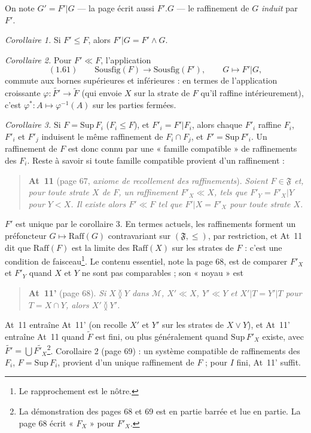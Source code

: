 \documentclass[11pt,a4paper]{article}
\begin{document}
On note $G' = F'|G$ --- la page écrit aussi $F'.G$ --- le raffinement de $G$
\emph{induit} par $F'$.

\emph{Corollaire 1.} Si $F' \leq F$, alors $F'|G = F' \wedge G$.

\emph{Corollaire 2.} Pour $F' \ll F$, l'application
\[
(1.61) \qquad \mathrm{Sousfig}(F) \longrightarrow \mathrm{Sousfig}(F'), \qquad G
\longmapsto F'|G ,
\]
commute aux bornes supérieures et inférieures : en termes de l'application
croissante $\varphi : \widetilde{F'} \to \widetilde{F}$ (qui envoie $X$ sur la
strate de $F$ qu'il raffine intérieurement), c'est $\varphi^{*} : A \mapsto
\varphi^{-1}(A)$ sur les parties fermées.

\emph{Corollaire 3.} Si $F = \mathrm{Sup}\,F_{i}$ ($F_{i} \leq F$), et $F'_{i} =
F'|F_{i}$, alors chaque $F'_{i}$ raffine $F_{i}$, $F'_{i}$ et $F'_{j}$ induisent
le même raffinement de $F_{i} \cap F_{j}$, et $F' = \mathrm{Sup}\,F'_{i}$. Un
raffinement de $F$ est donc connu par une « famille compatible » de raffinements
des $F_{i}$. Reste à savoir si toute famille compatible provient d'un
raffinement :

\begin{quote}
\textbf{At~11} (page 67, \emph{axiome de recollement des raffinements}).
\emph{Soient $F \in \mathfrak{F}$ et, pour toute strate $X$ de $F$, un raffinement
$F'_{X} \ll X$, tels que $F'_{Y} = F'_{X}|Y$ pour $Y < X$. Il existe alors $F' \ll
F$ tel que $F'|X = F'_{X}$ pour toute strate $X$.}
\end{quote}

$F'$ est unique par le corollaire 3. En termes actuels, les raffinements forment
un préfoncteur $G \mapsto \mathrm{Raff}(G)$ contravariant sur $(\mathfrak{F},
\leq)$, par restriction, et At~11 dit que $\mathrm{Raff}(F)$ est la limite des
$\mathrm{Raff}(X)$ sur les strates de $F$ : c'est une condition de
faisceau\footnote{Le rapprochement est le nôtre.}. Le contenu essentiel, note la
page 68, est de comparer $F'_{X}$ et $F'_{Y}$ quand $X$ et $Y$ ne sont pas
comparables ; son « noyau » est

\begin{quote}
\textbf{At~11'} (page 68). \emph{Si $X \between Y$ dans $\mathcal{M}$, $X' \ll
X$, $Y' \ll Y$ et $X'|T = Y'|T$ pour $T = X \cap Y$, alors $X' \between Y'$.}
\end{quote}

At~11 entraîne At~11' (on recolle $X'$ et $Y'$ sur les strates de $X \vee Y$),
et At~11' entraîne At~11 quand $\widetilde{F}$ est fini, ou plus généralement
quand $\mathrm{Sup}\,F'_{X}$ existe, avec $\widetilde{F'} = \bigcup
\widetilde{F'_{X}}$\footnote{La démonstration des pages 68 et 69 est en partie
barrée et lue en partie. La page 68 écrit « $F_{X}$ » pour $F'_{X}$.}. Corollaire
2 (page 69) : un système compatible de raffinements des $F_{i}$, $F = \mathrm{Sup}
\,F_{i}$, provient d'un unique raffinement de $F$ ; pour $I$ fini, At~11' suffit.
\end{document}
